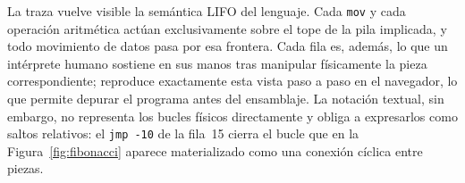 La traza vuelve visible la sem\'antica LIFO del lenguaje. Cada
\texttt{mov} y cada operaci\'on aritm\'etica act\'uan exclusivamente
sobre el tope de la pila implicada, y todo movimiento de datos pasa
por esa frontera. Cada fila es, adem\'as, lo que un int\'erprete
humano sostiene en sus manos tras manipular f\'isicamente la pieza
correspondiente; \sculpter reproduce exactamente esta vista paso a
paso en el navegador, lo que permite depurar el programa antes del
ensamblaje. La notaci\'on textual, sin embargo, no representa los
bucles f\'isicos directamente y obliga a expresarlos como saltos
relativos: el \texttt{jmp -10} de la fila~15 cierra el bucle que en
la Figura~\ref{fig:fibonacci} aparece materializado como una conexi\'on
c\'iclica entre piezas.

\endinput
